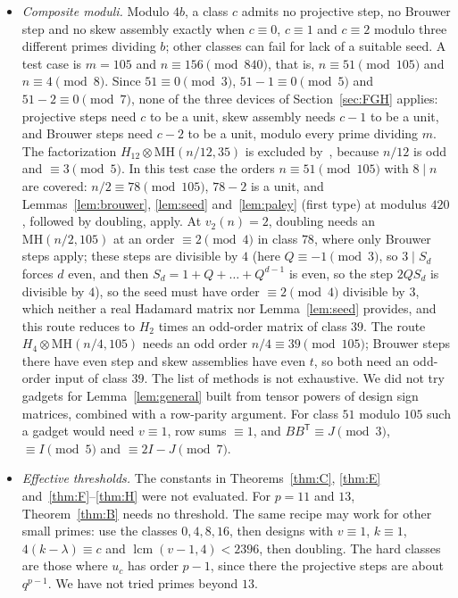 \documentclass[10pt]{article}
\theoremstyle{remark}
\newcommand{\MH}{\mathrm{MH}}
\newcommand{\tr}{^{\mathsf T}}
\begin{document}
\begin{itemize}
\item \emph{Composite moduli.} Modulo $4b$, a class $c$ admits no projective step, no Brouwer step and no skew assembly exactly when $c\equiv0$, $c\equiv1$ and $c\equiv2$ modulo three different primes dividing $b$; other classes can fail for lack of a suitable seed. A test case is $m=105$ and $n\equiv156\pmod{840}$, that is, $n\equiv51\pmod{105}$ and $n\equiv4\pmod8$. Since $51\equiv0\pmod3$, $51-1\equiv0\pmod5$ and $51-2\equiv0\pmod7$, none of the three devices of Section~\ref{sec:FGH} applies: projective steps need $c$ to be a unit, skew assembly needs $c-1$ to be a unit, and Brouwer steps need $c-2$ to be a unit, modulo every prime dividing $m$. The factorization $H_{12}\otimes\MH(n/12,35)$ is excluded by~\cite[Lemma~2.2]{K}, because $n/12$ is odd and $\equiv3\pmod5$. In this test case the orders $n\equiv51\pmod{105}$ with $8\mid n$ are covered: $n/2\equiv78\pmod{105}$, $78-2$ is a unit, and Lemmas~\ref{lem:brouwer}, \ref{lem:seed} and~\ref{lem:paley} (first type) at modulus $420$, followed by doubling, apply. At $v_2(n)=2$, doubling needs an $\MH(n/2,105)$ at an order $\equiv2\pmod4$ in class $78$, where only Brouwer steps apply; these steps are divisible by $4$ (here $Q\equiv-1\pmod3$, so $3\mid S_d$ forces $d$ even, and then $S_d=1+Q+\dots+Q^{d-1}$ is even, so the step $2QS_d$ is divisible by $4$), so the seed must have order $\equiv2\pmod4$ divisible by $3$, which neither a real Hadamard matrix nor Lemma~\ref{lem:seed} provides, and this route reduces to $H_2$ times an odd-order matrix of class $39$. The route $H_4\otimes\MH(n/4,105)$ needs an odd order $n/4\equiv39\pmod{105}$; Brouwer steps there have even step and skew assemblies have even $t$, so both need an odd-order input of class $39$. The list of methods is not exhaustive. We did not try gadgets for Lemma~\ref{lem:general} built from tensor powers of design sign matrices, combined with a row-parity argument. For class $51$ modulo $105$ such a gadget would need $v\equiv1$, row sums $\equiv1$, and $BB\tr\equiv J\pmod3$, $\equiv I\pmod 5$ and $\equiv2I-J\pmod7$.
\item \emph{Effective thresholds.} The constants in Theorems~\ref{thm:C}, \ref{thm:E} and~\ref{thm:F}--\ref{thm:H} were not evaluated. For $p=11$ and $13$, Theorem~\ref{thm:B} needs no threshold. The same recipe may work for other small primes: use the classes $0,4,8,16$, then designs with $v\equiv1$, $k\equiv1$, $4(k-\lambda)\equiv c$ and $\operatorname{lcm}(v-1,4)<2396$, then doubling. The hard classes are those where $u_c$ has order $p-1$, since there the projective steps are about $q^{p-1}$. We have not tried primes beyond $13$.

\end{itemize}
\end{document}
